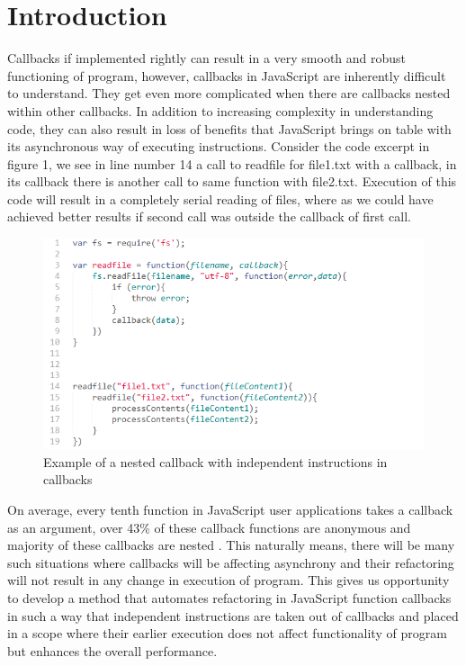 \documentclass[10pt,conference]{IEEEtran}
\begin{document}
\section{Introduction}
Callbacks if implemented rightly can result in a very smooth and robust functioning of program, however, callbacks in JavaScript are inherently difficult to understand. They get even more complicated when there are callbacks nested within other callbacks. In addition to increasing complexity in understanding code, they can also result in loss of benefits that JavaScript brings on table with its asynchronous way of executing instructions. Consider the code excerpt in figure 1, we see in line number 14 a call to readfile for file1.txt with a callback, in its callback there is another call to same function with file2.txt. Execution of this code will result in a completely serial reading of files, where as we could have achieved better results if second call was outside the callback of first call.
\begin{figure}[htbp]
	\includegraphics[scale=0.5]{introImg1.png}
	\caption{Example of a nested callback with independent instructions in callbacks}
	\label{fig}
\end{figure}

On average, every tenth function in JavaScript user applications takes a callback as an argument, over 43\% of these callback functions are anonymous and majority of these callbacks are nested \cite{b3}. This naturally means, there will be many such situations where callbacks will be affecting asynchrony and their refactoring will not result in any change in execution of program. This gives us opportunity to develop a method that automates refactoring in JavaScript function callbacks in such a way that independent instructions are taken out of callbacks and placed in a scope where their earlier execution does not affect functionality of program but enhances the overall performance.
\end{document}
